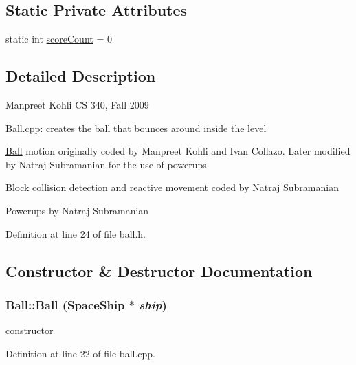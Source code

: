 \subsection*{Static Private Attributes}
\begin{DoxyCompactItemize}
\item 
static int \hyperlink{class_ball_a8f5ad3bbfeffac57949439217f806ac7}{scoreCount} = 0
\end{DoxyCompactItemize}


\subsection{Detailed Description}
Manpreet Kohli CS 340, Fall 2009

\hyperlink{ball_8cpp}{Ball.cpp}: creates the ball that bounces around inside the level

\hyperlink{class_ball}{Ball} motion originally coded by Manpreet Kohli and Ivan Collazo. Later modified by Natraj Subramanian for the use of powerups

\hyperlink{class_block}{Block} collision detection and reactive movement coded by Natraj Subramanian

Powerups by Natraj Subramanian 

Definition at line 24 of file ball.h.

\subsection{Constructor \& Destructor Documentation}
\hypertarget{class_ball_a30e61563c2285136d241396826967ca5}{
\subsubsection[{Ball}]{\setlength{\rightskip}{0pt plus 5cm}Ball::Ball ({\bf SpaceShip} $\ast$ {\em ship})}}
\label{class_ball_a30e61563c2285136d241396826967ca5}
constructor 

Definition at line 22 of file ball.cpp.


